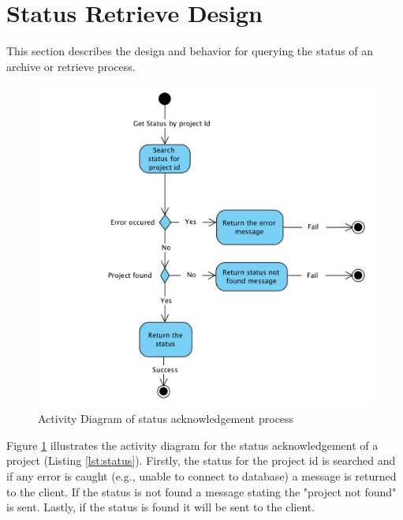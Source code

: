 \section{Status Retrieve Design}
This section describes the design and behavior for querying the status of an archive or retrieve process.

\begin{figure}[H]
    \centering \includegraphics[scale=0.7]{grafiken/activityStatus.png}
    \caption{Activity Diagram of status acknowledgement process}
    \label{fig:activityStatus}
\end{figure}

Figure \ref{fig:activityStatus} illustrates the activity diagram for the status acknowledgement of a project (Listing \ref{lst:status}). Firstly,
the status for the project id is searched and if any error is caught (e.g., unable to connect to database) a message is returned to the client. If the 
status is not found a message stating the "project not found" is sent. Lastly, if the status is found it will be sent to the client.

